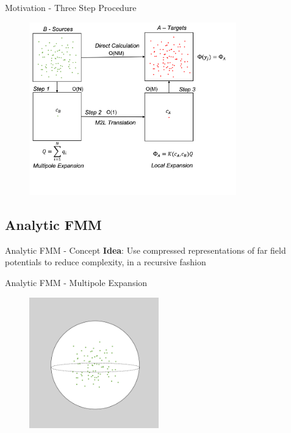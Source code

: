 \begin{frame}{Motivation - Three Step Procedure}
    \begin{figure}
        \centering
        \includegraphics[width=0.8\textwidth]{assets/three_step.png}
    \end{figure}
    \vspace{50pt}
\end{frame}

\subsection{Analytic FMM}
\begin{frame}{Analytic FMM - Concept}
    \textbf{Idea}: Use compressed representations of far field potentials to reduce complexity, in a recursive fashion
\end{frame}

\begin{frame}{Analytic FMM - Multipole Expansion}
    \begin{figure}
        {\includegraphics[width=0.5\textwidth]{assets/multipole.png}}
        \vspace{50pt}
    \end{figure}
\end{frame}


